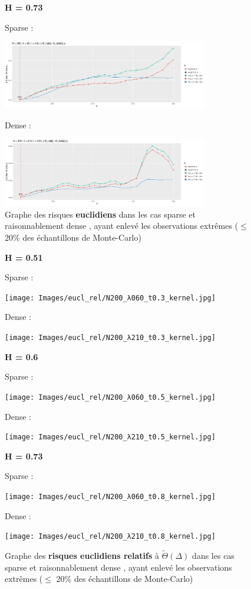 \begin{figure}[H]
	\centering
	\textbf{ H = 0.73 }

	Sparse :

	\includegraphics[width=0.8\textwidth]{Images/risque/N200_t0.8_lbd60.jpg}

	Dense :

	\includegraphics[width=0.8\textwidth]{Images/risque/N200_t0.8_lbd210.jpg}

	\label{fig:sparse_osef}
	\caption{Graphe des risques \textbf{euclidiens} dans les cas \og sparse \fg et \og raisonnablement dense \fg, ayant enlevé les observations extrêmes ($\leq$ 20\% des échantillons de Monte-Carlo)}
\end{figure}



\begin{figure}[H]
	\centering
	\textbf{ H = 0.51 }

	Sparse :

	\texttt{[image: Images/eucl\_rel/N200\_λ060\_t0.3\_kernel.jpg]}

	Dense :

	\texttt{[image: Images/eucl\_rel/N200\_λ210\_t0.3\_kernel.jpg]}
\end{figure}

\begin{figure}[H]
	\centering
	\textbf{ H = 0.6 }

	Sparse :

	\texttt{[image: Images/eucl\_rel/N200\_λ060\_t0.5\_kernel.jpg]}

	Dense :

	\texttt{[image: Images/eucl\_rel/N200\_λ210\_t0.5\_kernel.jpg]}
\end{figure}

\begin{figure}[H]
	\centering
	\textbf{ H = 0.73 }

	Sparse :

	\texttt{[image: Images/eucl\_rel/N200\_λ060\_t0.8\_kernel.jpg]}

	Dense :

	\texttt{[image: Images/eucl\_rel/N200\_λ210\_t0.8\_kernel.jpg]}

	\label{fig:sparse_osef_rel}
	\caption{Graphe des \textbf{risques euclidiens relatifs} à $\widetilde \Theta(\Delta)$ dans les cas \og sparse \fg et \og raisonnablement dense \fg, ayant enlevé les observations extrêmes ($\leq$ 20\% des échantillons de Monte-Carlo)}
\end{figure}

